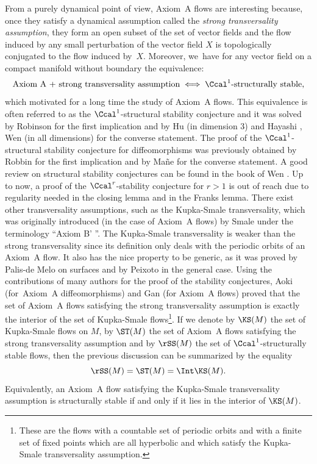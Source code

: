From a purely dynamical point of view, Axiom~A flows are interesting because, once they satisfy a dynamical assumption called the \textit{strong transversality assumption}, they form an open subset of the set of vector fields and the flow induced by any small perturbation of the vector field $X$ is topologically conjugated to the flow induced by~$X$. Moreover, we~have for any vector field on a compact manifold without boundary the equivalence:
\[
\text{Axiom~A + strong transversality assumption} \iff \text{$\Ccal^1$-structurally stable},
\]
which motivated for a long time the study of Axiom~A flows. This equivalence is often referred to as the $\Ccal^1$-structural stability conjecture and it was solved by Robinson \cite{robinson} for the first implication and by Hu \cite{hu} (in dimension $3$) and Hayashi \cite{hayashi}, Wen \cite{wen} (in all dimensions) for the converse statement. The proof of the $\Ccal^1$-structural stability conjecture for diffeomorphisms was previously obtained by Robbin \cite{robbin} for the first implication and by Ma\~{n}e \cite{mane} for the converse statement. A good review on structural stability conjectures can be found in the book of Wen \cite{wen-book}. Up to now, a proof of the $\Ccal^r$-stability conjecture for $r > 1$ is out of reach due to regularity needed in the closing lemma and in the Franks lemma. There exist other transversality assumptions, such as the Kupka-Smale transversality, which was originally introduced (in the case of Axiom~A flows) by Smale under the terminology ``Axiom B' ''. The Kupka-Smale transversality is weaker than the strong transversality since its definition only deals with the periodic orbits of an Axiom~A flow. It also has the nice property to be generic, as it was proved by Palis-de Melo \cite{palis-demelo} on surfaces and by Peixoto \cite{peixoto} in the general case. Using the contributions of many authors for the proof of the stability conjectures, Aoki \cite{aoki} (for~Axiom~A diffeomorphisms) and Gan \cite{gan} (for Axiom~A flows) proved that the set of Axiom~A flows satisfying the strong transversality assumption is exactly the interior of the set of Kupka-Smale flows\footnote{These are the flows with a countable set of periodic orbits and with a finite set of fixed points which are all hyperbolic and which satisfy the Kupka-Smale transversality assumption.}. If we denote by $\KS(M)$ the set of Kupka-Smale flows on $M$, by $\ST(M)$ the set of Axiom~A flows satisfying the strong transversality assumption and by $\rSS(M)$ the set of $\Ccal^1$-structurally stable flows, then the previous discussion can be summarized by the equality
\[
\rSS(M) = \ST(M) = \Int \KS(M).
\]
Equivalently, an Axiom~A flow satisfying the Kupka-Smale transversality assumption is structurally stable if and only if it lies in the interior of $\KS(M)$.

